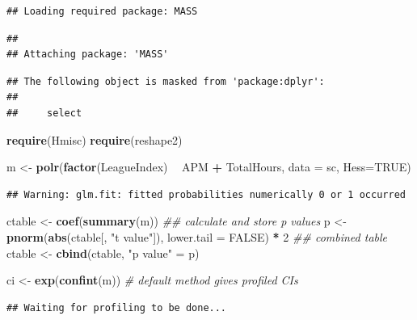 \documentclass[]{article}
\newenvironment{Shaded}{\begin{snugshade}}{\end{snugshade}}
\newcommand{\CommentTok}[1]{\textcolor[rgb]{0.56,0.35,0.01}{\textit{#1}}}
\newcommand{\DataTypeTok}[1]{\textcolor[rgb]{0.13,0.29,0.53}{#1}}
\newcommand{\DecValTok}[1]{\textcolor[rgb]{0.00,0.00,0.81}{#1}}
\newcommand{\KeywordTok}[1]{\textcolor[rgb]{0.13,0.29,0.53}{\textbf{#1}}}
\newcommand{\NormalTok}[1]{#1}
\newcommand{\OperatorTok}[1]{\textcolor[rgb]{0.81,0.36,0.00}{\textbf{#1}}}
\newcommand{\OtherTok}[1]{\textcolor[rgb]{0.56,0.35,0.01}{#1}}
\newcommand{\StringTok}[1]{\textcolor[rgb]{0.31,0.60,0.02}{#1}}
\begin{document}
\begin{verbatim}
## Loading required package: MASS
\end{verbatim}

\begin{verbatim}
## 
## Attaching package: 'MASS'
\end{verbatim}

\begin{verbatim}
## The following object is masked from 'package:dplyr':
## 
##     select
\end{verbatim}

\begin{Shaded}
\begin{Highlighting}[]
\KeywordTok{require}\NormalTok{(Hmisc)}
\KeywordTok{require}\NormalTok{(reshape2)}

\NormalTok{m <-}\StringTok{ }\KeywordTok{polr}\NormalTok{(}\KeywordTok{factor}\NormalTok{(LeagueIndex) }\OperatorTok{~}\StringTok{ }\NormalTok{APM }\OperatorTok{+}\StringTok{ }\NormalTok{TotalHours, }\DataTypeTok{data =}\NormalTok{ sc, }\DataTypeTok{Hess=}\OtherTok{TRUE}\NormalTok{)}
\end{Highlighting}
\end{Shaded}

\begin{verbatim}
## Warning: glm.fit: fitted probabilities numerically 0 or 1 occurred
\end{verbatim}

\begin{Shaded}
\begin{Highlighting}[]
\NormalTok{ctable <-}\StringTok{ }\KeywordTok{coef}\NormalTok{(}\KeywordTok{summary}\NormalTok{(m))}
\CommentTok{## calculate and store p values}
\NormalTok{p <-}\StringTok{ }\KeywordTok{pnorm}\NormalTok{(}\KeywordTok{abs}\NormalTok{(ctable[, }\StringTok{"t value"}\NormalTok{]), }\DataTypeTok{lower.tail =} \OtherTok{FALSE}\NormalTok{) }\OperatorTok{*}\StringTok{ }\DecValTok{2}
\CommentTok{## combined table}
\NormalTok{ctable <-}\StringTok{ }\KeywordTok{cbind}\NormalTok{(ctable, }\StringTok{"p value"}\NormalTok{ =}\StringTok{ }\NormalTok{p)}

\NormalTok{ci <-}\StringTok{ }\KeywordTok{exp}\NormalTok{(}\KeywordTok{confint}\NormalTok{(m)) }\CommentTok{# default method gives profiled CIs}
\end{Highlighting}
\end{Shaded}

\begin{verbatim}
## Waiting for profiling to be done...
\end{verbatim}
\end{document}
